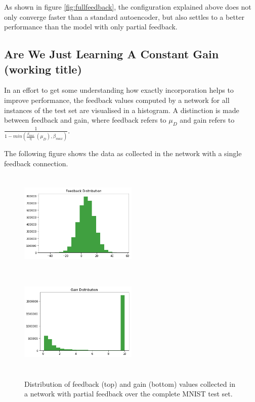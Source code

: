 \documentclass{article}
\begin{document}
  As shown in figure \ref{fig:fullfeedback}, the configuration explained above does not only converge faster than a standard autoencoder, but also settles to a better performance than the model with only partial feedback. 
    
 \subsection{Are We Just Learning A Constant Gain (working title)} 
 In an effort to get some understanding how exactly incorporation helps to improve performance, the feedback values computed by a network for all instances of the test set are visualised in a histogram. A distinction is made between feedback and gain, where feedback refers to $\mu_D$ and gain refers to $\frac{1}{1 - min(\frac{\beta_{max}}{\eta} \ (\mu_D), \beta_{max})}$. 
 
 The following figure shows the data as collected in the network with a single feedback connection. 
 
 \begin{figure}[H]
      \centering
      \includegraphics[width=0.5\textwidth,height=5cm,keepaspectratio]{img/constgainpartial.png}
      \includegraphics[width=0.5\textwidth,height=5cm,keepaspectratio]{img/constgainpartialgain.png}

      \caption{Distribution of feedback (top) and gain (bottom) values collected in a network with partial feedback over the complete MNIST test set. }
      \label{fig:partialhists}
  \end{figure}
  
\end{document}
